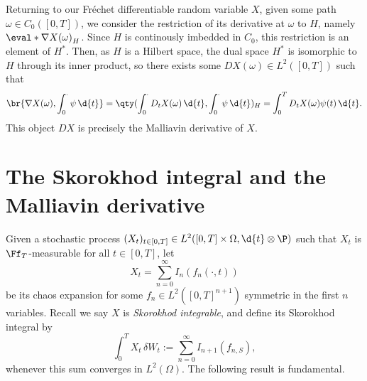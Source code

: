 \documentclass[
    a4paper,
    DIV=14,
    abstract=true,
    numbers=noenddot
]{scrartcl}
\begin{document}
Returning to our Fr\'{e}chet differentiable random variable $X$, given some
path $\omega \in C_0([0, T])$, we consider the restriction of its derivative at
$\omega$ to $H$, namely $\eval*{\nabla{X}(\omega)}_H$. Since $H$ is continously
imbedded in $C_0$, this restriction is an element of $H^*$. Then, as $H$ is a
Hilbert space, the dual space $H^*$ is isomorphic to $H$ through its inner
product, so there exists some $DX(\omega) \in L^2([0, T])$ such
that
\[
	\br{\nabla{X}(\omega), \int_0^\cdot \psi \, \d{t}}
	= \qty(\int_0^\cdot D_t{X}(\omega) \, \d{t},
	\int_0^\cdot \psi \, \d{t})_H
	= \int_0^T D_t{X}(\omega) \psi(t) \, \d{t}.
\]
This object $DX$ is precisely the Malliavin derivative of $X$.

\section{The Skorokhod integral and the Malliavin derivative}
Given a stochastic process $(X_t)_{t \in [0, T]} \in L^2([0,T]\times\Omega,
	\d{t}\otimes\P)$ such that $X_t$ is $\Ff_T$-measurable for all $t \in
	[0, T]$, let
\[
	X_t = \sum_{n = 0}^\infty I_n(f_n(\cdot, t))
\]
be its chaos expansion for some $f_n \in L^2([0, T]^{n + 1})$ symmetric in the
first $n$ variables. Recall we say $X$ is \emph{Skorokhod integrable}, and
define its Skorokhod integral by
\[
	\int_0^T X_t \, \delta{W}_t := \sum_{n = 0}^\infty I_{n + 1}({f}_{n,S}),
\]
whenever this sum converges in $L^2(\Omega)$. The following result is
fundamental.
\end{document}
